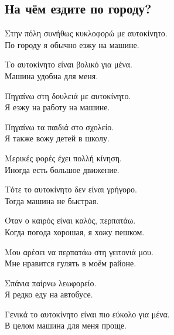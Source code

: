 \documentclass[12pt]{article}
\newcommand{\my}[1]{\textcolor{gray!80!white}{#1}}
\newenvironment{page}{\clearpage\normalsize\null\vfill}{\vfill\null}
\newenvironment{textblock}{\begin{minipage}{\textwidth}}{\end{minipage}\smallskip}
\begin{document}
	\begin{page}
		\subsection{На чём ездите по городу?}
		\small
		\begin{textblock}
			Στην πόλη συνήθως κυκλοφορώ με αυτοκίνητο.\\
			\my{По городу я обычно езжу на машине.}
			
			Το αυτοκίνητο είναι βολικό για μένα.\\
			\my{Машина удобна для меня.}
			
			Πηγαίνω στη δουλειά με αυτοκίνητο.\\
			\my{Я езжу на работу на машине.}
			
			Πηγαίνω τα παιδιά στο σχολείο.\\
			\my{Я также вожу детей в школу.}
			
			Μερικές φορές έχει πολλή κίνηση.\\
			\my{Иногда есть большое движение.}
			
			Τότε το αυτοκίνητο δεν είναι γρήγορο.\\
			\my{Тогда машина не быстрая.}
			
			Όταν ο καιρός είναι καλός, περπατάω.\\
			\my{Когда погода хорошая, я хожу пешком.}
			
			Μου αρέσει να περπατάω στη γειτονιά μου.\\
			\my{Мне нравится гулять в моём районе.}
			
			Σπάνια παίρνω λεωφορείο.\\
			\my{Я редко еду на автобусе.}
			
			Γενικά το αυτοκίνητο είναι πιο εύκολο για μένα.\\
			\my{В целом машина для меня проще.}
		\end{textblock}
	\end{page}
	
\end{document}

